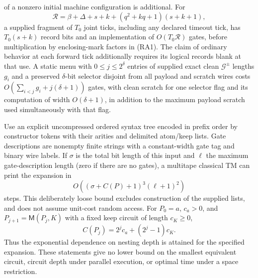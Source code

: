 \begin{theorem}
of a nonzero initial machine configuration is additional.
For
\[
 \mathcal R=\beta+\Delta+s+k+(q^2+kq+1)(s+k+1),
\]
a supplied fragment of $T_0$ joint ticks, including any declared timeout
tick, has $T_0(s+k)$
record bits and an implementation of $O(T_0\mathcal R)$ gates, before
multiplication by enclosing-mark factors in (RA1). The claim of ordinary
behavior at each forward tick additionally requires its logical records
blank at that use. A static menu with $0\leq j\leq2^\delta$ entries
of supplied exact clean $\mathcal G^{\pm}$ lengths $g_i$ and
a preserved $\delta$-bit selector disjoint from all payload and scratch
wires costs
$O(\sum_{i<j}g_i+j(\delta+1))$ gates, with clean scratch for one
selector flag and its computation of width $O(\delta+1)$, in addition
to the maximum payload scratch used simultaneously with that flag.

Use an explicit uncompressed ordered syntax tree encoded in prefix order
by constructor tokens with their arities and delimited atom/keep lists. Gate descriptions
are nonempty finite strings with a constant-width gate tag and binary
wire labels. If $\sigma$ is the total bit length of this input and
$\ell$ the maximum gate-description length (zero if there are no gates),
a multitape classical TM can print the
expansion in
\[
 O((\sigma+C(P)+1)^3(\ell+1)^2)                       \tag{RA3}
\]
steps. This deliberately loose bound excludes construction of the supplied
lists, and does not assume unit-cost random access.
For $P_0=a$, $c_a>0$, and $P_{j+1}=\mathsf M(P_j,K)$ with a fixed
keep circuit of length $c_K\geq0$,
\[
 C(P_j)=2^jc_a+(2^j-1)c_K.                            \tag{RA4}
\]
Thus the exponential dependence on nesting depth is attained for the
specified expansion. These statements give no lower bound on the
smallest equivalent circuit, circuit depth under parallel execution,
or optimal time under a space restriction.
\end{theorem}
